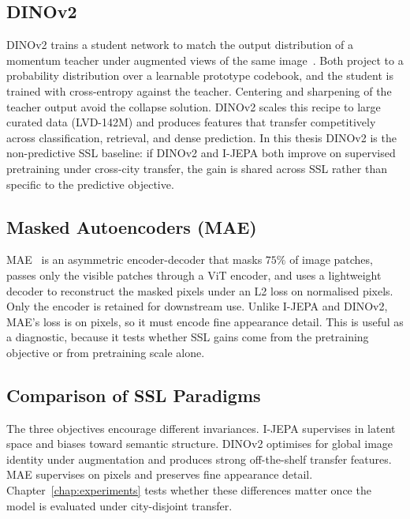 \subsection{DINOv2}
\label{sec:bg-dinov2}

DINOv2 trains a student network to match the output distribution of a momentum teacher under augmented views of the same image~\cite{oquab-dinov2-2024,caron-dino-2021}. Both project to a probability distribution over a learnable prototype codebook, and the student is trained with cross-entropy against the teacher. Centering and sharpening of the teacher output avoid the collapse solution. DINOv2 scales this recipe to large curated data (LVD-142M) and produces features that transfer competitively across classification, retrieval, and dense prediction. In this thesis DINOv2 is the non-predictive SSL baseline: if DINOv2 and I-JEPA both improve on supervised pretraining under cross-city transfer, the gain is shared across SSL rather than specific to the predictive objective.

\subsection{Masked Autoencoders (MAE)}
\label{sec:bg-mae}

MAE~\cite{he-mae-2022} is an asymmetric encoder-decoder that masks $75\%$ of image patches, passes only the visible patches through a ViT encoder, and uses a lightweight decoder to reconstruct the masked pixels under an L2 loss on normalised pixels. Only the encoder is retained for downstream use. Unlike I-JEPA and DINOv2, MAE's loss is on pixels, so it must encode fine appearance detail. This is useful as a diagnostic, because it tests whether SSL gains come from the pretraining objective or from pretraining scale alone.

\subsection{Comparison of SSL Paradigms}
\label{sec:bg-ssl-compare}

The three objectives encourage different invariances. I-JEPA supervises in latent space and biases toward semantic structure. DINOv2 optimises for global image identity under augmentation and produces strong off-the-shelf transfer features. MAE supervises on pixels and preserves fine appearance detail. Chapter~\ref{chap:experiments} tests whether these differences matter once the model is evaluated under city-disjoint transfer.

